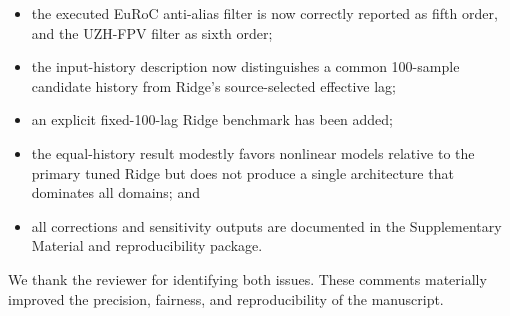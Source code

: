 \documentclass[12pt,a4paper]{article}
\begin{document}
\begin{itemize}[leftmargin=*]
    \item the executed EuRoC anti-alias filter is now correctly reported as fifth order, and the UZH-FPV filter as sixth order;
    \item the input-history description now distinguishes a common 100-sample candidate history from Ridge's source-selected effective lag;
    \item an explicit fixed-100-lag Ridge benchmark has been added;
    \item the equal-history result modestly favors nonlinear models relative to the primary tuned Ridge but does not produce a single architecture that dominates all domains; and
    \item all corrections and sensitivity outputs are documented in the Supplementary Material and reproducibility package.
\end{itemize}

We thank the reviewer for identifying both issues. These comments materially improved the precision, fairness, and reproducibility of the manuscript.
\end{document}

